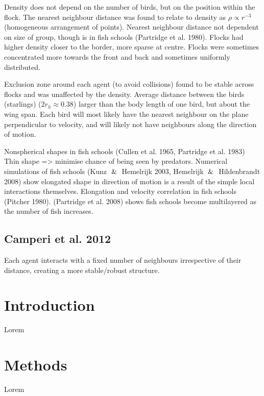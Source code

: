 \documentclass[10pt,twocolumn]{revtex4-2}    %
\begin{document}
Density does not depend on the number of birds, but on the position within the flock. The nearest neighbour distance was found to relate to density as $\rho \propto r^{-3}$ (homogeneous arrangement of points). Nearest neighbour distance not dependent on size of group, though is in fish schools (Partridge et al. 1980). Flocks had higher density closer to the border, more sparse at centre. Flocks were sometimes concentrated more towards the front and back and sometimes uniformly distributed. 

Exclusion zone around each agent (to avoid collisions) found to be stable across flocks and was unaffected by the density. Average distance between the birds (starlings) ($2r_h \approx 0.38$) larger than the body length of one bird, but about the wing span. Each bird will most likely have the nearest neighbour on the plane perpendicular to velocity, and will likely not have neighbours along the direction of motion. 

Nonspherical shapes in fish schools (Cullen et al. 1965, Partridge et al. 1983) Thin shape => minimise chance of being seen by predators. Numerical simulations of fish schools (Kunz $\And$ Hemelrijk 2003, Hemelrijk $\And$ Hildenbrandt 2008) show elongated shape in direction of motion is a result of the simple local interactions themselves. Elongation and velocity correlation in fish schools (Pitcher 1980). (Partridge et al. 2008) shows fish schools become multilayered as the number of fish increases.


\subsection{Camperi et al. 2012}

Each agent interacts with a fixed number of neighbours irrespective of their distance, creating a more stable/robust structure. 








\section{Introduction} 

Lorem 

\section{Methods} 

Lorem 
 
\end{document}
